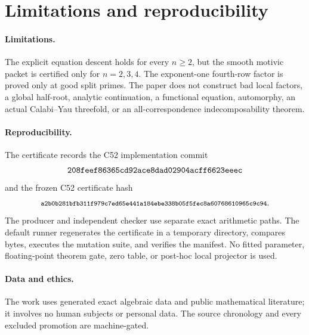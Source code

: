 \section{Limitations and reproducibility}

\paragraph{Limitations.}
The explicit equation descent holds for every \(n\ge2\), but the smooth
motivic packet is certified only for \(n=2,3,4\).  The exponent-one
fourth-row factor is proved only at good split primes.  The paper does not
construct bad local factors, a global half-root, analytic continuation, a
functional equation, automorphy, an actual Calabi--Yau threefold, or an
all-correspondence indecomposability theorem.

\paragraph{Reproducibility.}
The certificate records the C52 implementation commit
\[
\text{\ttfamily 208feef86365cd92ace8dad02904acff6623eeec}
\]
and the frozen C52 certificate hash
\[
\text{\footnotesize\ttfamily
a2b0b281bfb311f979c7ed65e441a184ebe338b05f5fec8a60768610965c9c94}.
\]
The producer and independent checker use separate exact arithmetic paths.
The default runner regenerates the certificate in a temporary directory,
compares bytes, executes the mutation suite, and verifies the manifest.
No fitted parameter, floating-point theorem gate, zero table, or
post-hoc local projector is used.

\paragraph{Data and ethics.}
The work uses generated exact algebraic data and public mathematical
literature; it involves no human subjects or personal data.  The source
chronology and every excluded promotion are machine-gated.
